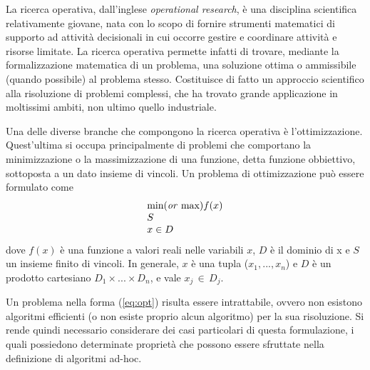 La ricerca operativa, dall'inglese \textit{operational research}, è una disciplina scientifica relativamente 
giovane, nata con lo scopo di fornire strumenti matematici di supporto ad attività decisionali in cui occorre gestire e coordinare 
attività e risorse limitate. La ricerca operativa permette infatti di trovare, mediante la formalizzazione 
matematica di un problema, una soluzione ottima o ammissibile (quando possibile) al problema stesso. 
Costituisce di fatto un approccio scientifico alla risoluzione di problemi 
complessi, che ha trovato grande applicazione in moltissimi ambiti, non ultimo quello industriale. 

Una delle diverse branche che compongono la ricerca operativa è l'ottimizzazione. 
Quest'ultima si occupa principalmente di problemi che comportano la minimizzazione o la massimizzazione di una funzione, detta funzione
obbiettivo, sottoposta a un dato insieme di vincoli. 
Un problema di ottimizzazione può essere formulato come 
\begin{align}
	\label{eq:opt}
	\begin{array}{l}
      \text{min(\textit{or} max)}f(x)\\
      S	\\
      x \in D
    \end{array}
\end{align}
dove $f(x)$ è una funzione a valori reali nelle variabili $x$, $D$ è il dominio di x e $S$ un insieme finito di vincoli. In generale,  
$x$ è una tupla ($x_1,...,x_n$) e $D$ è un prodotto cartesiano $D_1 \times ... \times D_n$, e vale $x_j \, \in \, D_j$. 

Un problema nella forma (\ref{eq:opt}) risulta essere intrattabile, ovvero non esistono algoritmi efficienti (o non esiste proprio
alcun algoritmo) per la sua risoluzione. Si rende quindi necessario considerare dei casi particolari di questa formulazione, i quali 
possiedono determinate proprietà che possono essere sfruttate nella definizione di algoritmi ad-hoc.
\newpage

